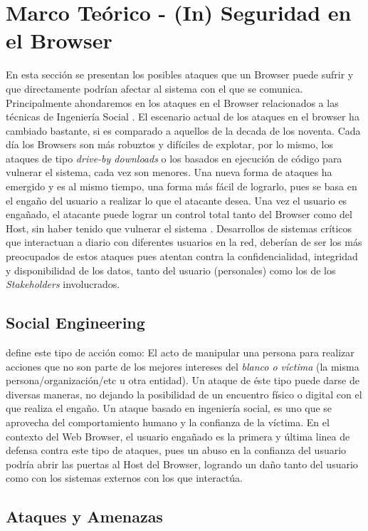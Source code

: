 \chapter{Marco Teórico - (In) Seguridad en el Browser}
\label{chap3:FC}

En esta sección se presentan los posibles ataques que un Browser puede sufrir y que directamente podrían afectar al sistema con el que se comunica. Principalmente ahondaremos en los ataques en el Browser relacionados a las técnicas de Ingeniería Social \cite{socEngineeering}. El escenario actual de los ataques en el browser ha cambiado bastante, si es comparado a aquellos de la decada de los noventa. Cada día los Browsers son más robuztos y difíciles de explotar, por lo mismo, los ataques de tipo \textit{drive-by downloads} o los basados en ejecución de código para vulnerar el sistema, cada vez son menores. Una nueva forma de ataques ha emergido y es al mismo tiempo, una forma más fácil de lograrlo, pues se basa en el engaño del usuario a realizar lo que el atacante desea. Una vez el usuario es engañado, el atacante puede lograr un control total tanto del Browser como del Host, sin haber tenido que vulnerar el sistema \cite{Rajab2013}. Desarrollos de sistemas críticos que interactuan a diario con diferentes usuarios en la red, deberían de ser los más preocupados de estos ataques pues atentan contra la confidencialidad, integridad y disponibilidad de los datos, tanto del usuario (personales) como los de los \textit{Stakeholders} involucrados.

\section{Social Engineering}
\cite{socEngineeering} define este tipo de acción como: El acto de manipular una persona para realizar acciones que no son parte de los mejores intereses del \textit{blanco o víctima} (la misma persona/organización/etc u otra entidad). Un ataque de éste tipo puede darse de diversas maneras, no dejando la posibilidad de un encuentro físico o digital con el que realiza el engaño. Un ataque basado en ingeniería social, es uno que se aprovecha del comportamiento humano y la confianza de la víctima. En el contexto del Web Browser, el usuario engañado es la primera y última linea de defensa contra este tipo de ataques, pues un abuso en la confianza del usuario podría abrir las puertas al Host del Browser, logrando un daño tanto del usuario como con los sistemas externos con los que interactúa.

\section{Ataques y Amenazas}
